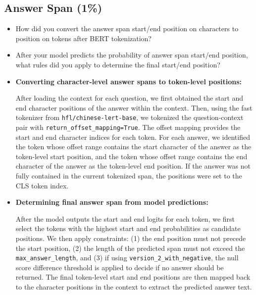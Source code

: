 \documentclass{article}
\begin{document}
\subsection{Answer Span (1\%)}
\begin{itemize}
    \item How did you convert the answer span start/end position on characters to position on tokens after BERT tokenization?
    \item After your model predicts the probability of answer span start/end position, what rules did you apply to determine the final start/end position?
\end{itemize}

\vspace{1em}

\begin{itemize}
    \item \textbf{Converting character-level answer spans to token-level positions:}

          After loading the context for each question, we first obtained the start and end character positions of the answer within the context. Then, using the fast tokenizer from \texttt{hfl/chinese-lert-base}, we tokenized the question-context pair with \texttt{return\_offset\_mapping=True}. The offset mapping provides the start and end character indices for each token. For each answer, we identified the token whose offset range contains the start character of the answer as the token-level start position, and the token whose offset range contains the end character of the answer as the token-level end position. If the answer was not fully contained in the current tokenized span, the positions were set to the CLS token index.

    \item \textbf{Determining final answer span from model predictions:}

          After the model outputs the start and end logits for each token, we first select the tokens with the highest start and end probabilities as candidate positions. We then apply constraints:
          (1) the end position must not precede the start position,
          (2) the length of the predicted span must not exceed the \texttt{max\_answer\_length},
          and (3) if using \texttt{version\_2\_with\_negative}, the null score difference threshold is applied to decide if no answer should be returned. The final token-level start and end positions are then mapped back to the character positions in the context to extract the predicted answer text.
\end{itemize}
\end{document}
